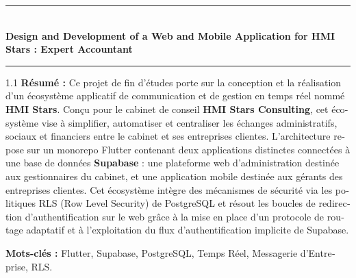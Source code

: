 \thispagestyle{empty}
\vspace*{\fill}
\begin{center}
    \textcolor{univblue}{\rule{\textwidth}{3pt}} \\[0.3cm]
    {\LARGE\bfseries Design and Development of a Web and Mobile Application for HMI Stars : Expert Accountant} \\[0.4cm]
    \textcolor{univblue}{\rule{\textwidth}{3pt}}
\end{center}

\vspace{0.5cm}

\begin{otherlanguage}{french}
\begin{spacing}{1.1}
\noindent \textbf{Résumé : } 
Ce projet de fin d'études porte sur la conception et la réalisation d'un écosystème applicatif de communication et de gestion en temps réel nommé \textbf{HMI Stars}. Conçu pour le cabinet de conseil \textbf{HMI Stars Consulting}, cet écosystème vise à simplifier, automatiser et centraliser les échanges administratifs, sociaux et financiers entre le cabinet et ses entreprises clientes. L'architecture repose sur un monorepo Flutter contenant deux applications distinctes connectées à une base de données \textbf{Supabase} : une plateforme web d'administration destinée aux gestionnaires du cabinet, et une application mobile destinée aux gérants des entreprises clientes. Cet écosystème intègre des mécanismes de sécurité via les politiques RLS (Row Level Security) de PostgreSQL et résout les boucles de redirection d'authentification sur le web grâce à la mise en place d'un protocole de routage adaptatif et à l'exploitation du flux d'authentification implicite de Supabase.

\noindent \textbf{Mots-clés : } Flutter, Supabase, PostgreSQL, Temps Réel, Messagerie d'Entreprise, RLS.
\end{spacing}
\end{otherlanguage}

\vspace{0.6cm}

